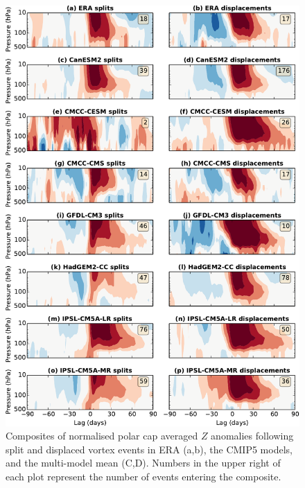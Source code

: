 \begin{figure}
 \centering
 \noindent\includegraphics[width=\textwidth]{figures/chapter-models/dripping_paint1.pdf}
 \caption[NAM composites for splits and displacements in the CMIP5
 models]{Composites of normalised polar cap averaged $Z$ anomalies following
   split and displaced vortex events in ERA (a,b), the CMIP5 models, and the
   multi-model mean (C,D). Numbers in the upper right of each plot represent the
   number of events entering the composite.}
 \label{fig:cmip5_dripping_paint}
\end{figure}

